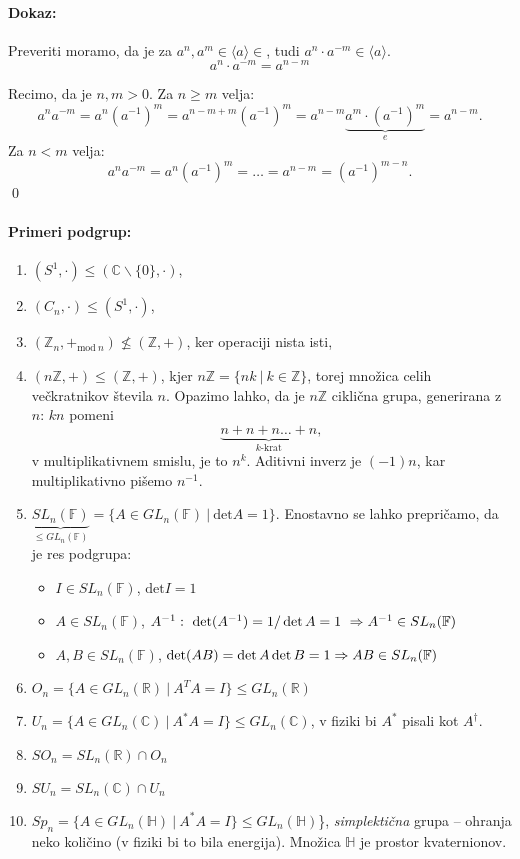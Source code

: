 \paragraph{Dokaz:}
Preveriti moramo, da je za $a^n,a^m \in \langle a \rangle \in$, tudi $a^n\cdot a^{-m} \in \langle a\rangle$.
\[
	a^n\cdot a^{-m} = a^{n-m}
\]

\ni Recimo, da je $n,m > 0$. Za $n \geq m$ velja:
\[
	a^n a^{-m} = a^n (a^{-1})^m = a^{n-m+m} (a^{-1})^m = a^{n-m} \underbrace{a^m\cdot(a^{-1})^m}_{e} = a^{n-m}.
\]
Za $n < m$ velja:
\[
	a^n a^{-m} = a^n(a^{-1})^m = \ldots = a^{n-m} = (a^{-1})^{m-n}.
\]
\qed

\paragraph{Primeri podgrup:}
\begin{enumerate}
	\item{$(S^1,\cdot) \leq (\mathbb{C}\backslash\{0\}, \cdot)$},
	\item{$(C_n,\cdot) \leq (S^1, \cdot)$},
	\item{$(\mathbb{Z}_n, +_{\text{mod}\ n}) \nleq (\mathbb{Z}, +)$, ker operaciji nista isti,}
	\item{$(n\mathbb{Z}, +) \leq (\mathbb{Z}, +)$, kjer $n\mathbb{Z} = \{nk\ |\ k \in \mathbb{Z}\}$, torej mno\v zica celih ve\v ckratnikov
		\v stevila $n$. Opazimo lahko, da je $n\mathbb{Z}$ cikli\v cna grupa, generirana z $n$: $kn$ pomeni
		\[
			\underbrace{n + n + n \ldots + n}_{k\text{-krat}},
		\] v multiplikativnem smislu, je to $n^k$. Aditivni inverz je $(-1)n$, kar multiplikativno pi\v semo $n^{-1}$.}
	\item{$\underbrace{SL_n(\mathbb{F})}_{\leq GL_n(\mathbb{F})} = \{A \in GL_n(\mathbb{F})\ |\ \text{det}A = 1\}$. Enostavno se lahko prepri\v camo, da je
		res podgrupa:
		\begin{itemize}
			\item{$I \in SL_n(\mathbb{F})$, $\text{det}I = 1$}
			\item{$A \in SL_n(\mathbb{F})$, $A^{-1}:\ \det (A^{-1}) = 1/\det A = 1\ \Rightarrow A^{-1} \in SL_n(\mathbb{F})$}
			\item{$A,B \in SL_n(\mathbb{F})$, $\det (AB) = \det A\det B = 1 \Rightarrow AB \in SL_n(\mathbb{F})$}
		\end{itemize}}
	\item{$O_n = \{A \in GL_n(\mathbb{R})\ |\ A^T A = I\} \leq GL_n (\mathbb{R})$}
	\item{$U_n = \{A \in GL_n(\mathbb{C})\ |\ A^* A = I\} \leq GL_n (\mathbb{C})$, v fiziki bi $A^*$ pisali kot $A^\dagger$.}
	\item{$SO_n = SL_n (\mathbb{R}) \cap O_n$}
	\item{$SU_n = SL_n (\mathbb{C}) \cap U_n$}
	\item{$Sp_n = \{A \in GL_n(\mathbb{H})\ |\ A^* A = I\} \leq GL_n (\mathbb{H})$\}, \emph{simplekti\v cna} grupa -- ohranja neko koli\v cino (v fiziki bi to bila energija). Mno\v zica
		$\mathbb{H}$ je prostor kvaternionov.}
\end{enumerate}


